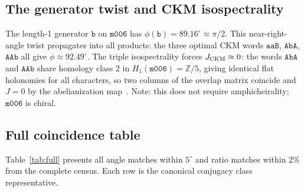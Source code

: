 \documentclass[11pt,a4paper]{article}
\newcommand{\mfld}[1]{\texttt{#1}}
\newcommand{\word}[1]{\texttt{#1}}
\newcommand{\degr}{^{\circ}}
\begin{document}
\subsection{The generator twist and CKM isospectrality}
\label{sec:generator}

The length-1 generator $\word{b}$ on $\mfld{m006}$ has
$\phi(\word{b})=89.16\degr\approx\pi/2$.
This near-right-angle twist propagates into all products: the three optimal
CKM words $\word{aaB}$, $\word{AbA}$, $\word{AAb}$ all give
$\phi\approx 92.49\degr$.
The triple isospectrality forces $J_{\rm CKM}\approx 0$: the words $\word{AbA}$ and $\word{AAb}$ share homology class $2$ in $H_1(\mfld{m006})=\mathbb{Z}/5$, giving identical flat holonomies for all characters, so two columns of the overlap matrix coincide and $J=0$ by the abelianization map~\cite{GentryCKM}. Note: this does not require amphicheirality; $\mfld{m006}$ is chiral.

\subsection{Full coincidence table}
\label{sec:full_table}

Table~\ref{tab:full} presents all angle matches within $5\degr$ and ratio
matches within $2\%$ from the complete census.
Each row is the canonical conjugacy class representative.
\end{document}
